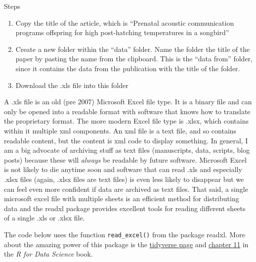 \documentclass[]{book}
\newenvironment{Shaded}{\begin{snugshade}}{\end{snugshade}}
\newcommand{\CommentTok}[1]{\textcolor[rgb]{0.56,0.35,0.01}{\textit{#1}}}
\newcommand{\DataTypeTok}[1]{\textcolor[rgb]{0.13,0.29,0.53}{#1}}
\newcommand{\KeywordTok}[1]{\textcolor[rgb]{0.13,0.29,0.53}{\textbf{#1}}}
\newcommand{\NormalTok}[1]{#1}
\newcommand{\OperatorTok}[1]{\textcolor[rgb]{0.81,0.36,0.00}{\textbf{#1}}}
\newcommand{\StringTok}[1]{\textcolor[rgb]{0.31,0.60,0.02}{#1}}
\providecommand{\tightlist}{%
  \setlength{\itemsep}{0pt}\setlength{\parskip}{0pt}}
\begin{document}
Steps

\begin{enumerate}
\def\labelenumi{\arabic{enumi}.}
\tightlist
\item
  Copy the title of the article, which is ``Prenatal acoustic communication programs offspring for high post-hatching temperatures in a songbird''
\item
  Create a new folder within the ``data'' folder. Name the folder the title of the paper by pasting the name from the clipboard. This is the ``data from'' folder, since it contains the data from the publication with the title of the folder.
\item
  Download the .xls file into this folder
\end{enumerate}

A .xls file is an old (pre 2007) Microsoft Excel file type. It is a binary file and can only be opened into a readable format with software that knows how to translate the proprietary format. The more modern Excel file type is .xlsx, which contains within it multiple xml components. An xml file is a text file, and so contains readable content, but the content is xml code to display something. In general, I am a big advocate of archiving stuff as text files (manuscripts, data, scripts, blog posts) because these will \emph{always} be readable by future software. Microsoft Excel is not likely to die anytime soon and software that can read .xls and especially .xlsx files (again, .xlsx files are text files) is even less likely to disappear but we can feel even more confident if data are archived as text files. That said, a single microsoft excel file with multiple sheets is an efficient method for distributing data and the readxl package provides excellent tools for reading different sheets of a single .xls or .xlsx file.

The code below uses the function \texttt{read\_excel()} from the package readxl. More about the amazing power of this package is the \href{https://readxl.tidyverse.org}{tidyverse page} and \href{http://r4ds.had.co.nz/data-import.html}{chapter 11} in the \emph{R for Data Science} book.

\begin{Shaded}
\end{Shaded}
\end{document}
